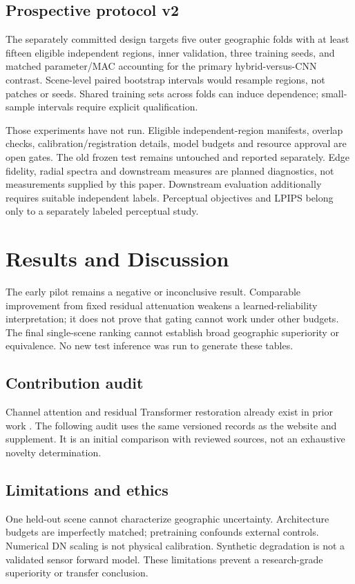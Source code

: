 \documentclass[conference]{IEEEtran}
\begin{document}
\subsection{Prospective protocol v2}
The separately committed design targets five outer geographic folds with at least fifteen eligible independent regions, inner validation, three training seeds, and matched parameter/MAC accounting for the primary hybrid-versus-CNN contrast. Scene-level paired bootstrap intervals would resample regions, not patches or seeds. Shared training sets across folds can induce dependence; small-sample intervals require explicit qualification.

Those experiments have not run. Eligible independent-region manifests, overlap checks, calibration/registration details, model budgets and resource approval are open gates. The old frozen test remains untouched and reported separately. Edge fidelity, radial spectra and downstream measures are planned diagnostics, not measurements supplied by this paper. Downstream evaluation additionally requires suitable independent labels. Perceptual objectives and LPIPS belong only to a separately labeled perceptual study.


\section{Results and Discussion}



The early pilot remains a negative or inconclusive result. Comparable improvement from fixed residual attenuation weakens a learned-reliability interpretation; it does not prove that gating cannot work under other budgets. The final single-scene ranking cannot establish broad geographic superiority or equivalence. No new test inference was run to generate these tables.


\subsection{Contribution audit}
Channel attention and residual Transformer restoration already exist in prior work \cite{zhang2018rcan,liang2021swinir}. The following audit uses the same versioned records as the website and supplement. It is an initial comparison with reviewed sources, not an exhaustive novelty determination.



\subsection{Limitations and ethics}
One held-out scene cannot characterize geographic uncertainty. Architecture budgets are imperfectly matched; pretraining confounds external controls. Numerical DN scaling is not physical calibration. Synthetic degradation is not a validated sensor forward model. These limitations prevent a research-grade superiority or transfer conclusion.
\end{document}
